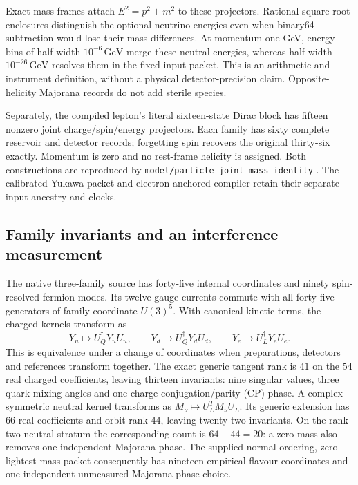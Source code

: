 Exact mass frames attach $E^2=p^2+m^2$ to these projectors. Rational
square-root enclosures distinguish the optional neutrino energies even
when binary64 subtraction would lose their mass differences. At momentum
one GeV, energy bins of half-width $10^{-6}\,\mathrm{GeV}$ merge these
neutral energies, whereas half-width $10^{-26}\,\mathrm{GeV}$ resolves
them in the fixed input packet. This is an arithmetic and instrument
definition, without a physical detector-precision claim. Opposite-helicity
Majorana records do not add sterile species.

Separately, the compiled lepton's literal sixteen-state Dirac block has
fifteen nonzero joint charge/spin/energy projectors. Each family has
sixty complete reservoir and detector records; forgetting spin recovers
the original thirty-six exactly. Momentum is zero and no rest-frame
helicity is assigned. Both constructions are reproduced by
\texttt{model/particle\_joint\_mass\_identity} \cite{ophrepo}.
The calibrated Yukawa packet and electron-anchored compiler retain
their separate input ancestry and clocks.

\subsection{Family invariants and an interference measurement}

The native three-family source has forty-five internal coordinates and
ninety spin-resolved fermion modes. Its twelve gauge currents commute
with all forty-five generators of family-coordinate $U(3)^5$.
With canonical kinetic terms, the charged kernels transform as
\[
 Y_u\mapsto U_Q^\dagger Y_uU_u,\qquad
 Y_d\mapsto U_Q^\dagger Y_dU_d,\qquad
 Y_e\mapsto U_L^\dagger Y_eU_e.
\]
This is equivalence under a change of coordinates when preparations,
detectors and references transform together. The exact generic tangent
rank is $41$ on the $54$ real charged coefficients, leaving thirteen
invariants: nine singular values, three quark mixing angles and one
charge-conjugation/parity (CP) phase. A complex symmetric neutral kernel
transforms as $M_\nu\mapsto U_L^TM_\nu U_L$. Its generic extension has
$66$ real coefficients and orbit rank $44$, leaving twenty-two
invariants. On the rank-two neutral stratum the corresponding count is
$64-44=20$: a zero mass also removes one independent Majorana phase.
The supplied normal-ordering, zero-lightest-mass packet consequently has
nineteen empirical flavour coordinates and one independent unmeasured
Majorana-phase choice.

